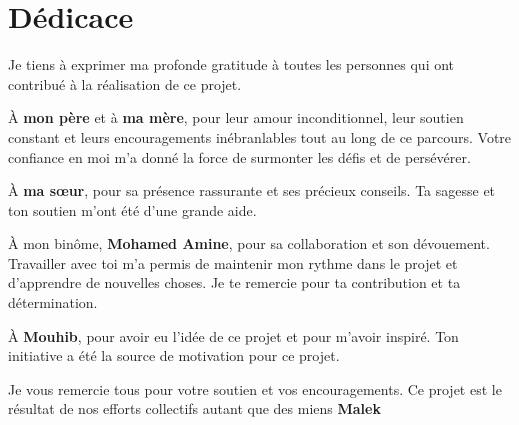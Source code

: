 \thispagestyle{empty}

\chapter*{Dédicace}

Je tiens à exprimer ma profonde gratitude à toutes les personnes qui ont contribué à la réalisation de ce projet.
\vspace{1em}

À \textbf{mon père} et à \textbf{ma mère}, pour leur amour inconditionnel, leur soutien constant et leurs encouragements inébranlables tout au long de ce parcours. Votre confiance en moi m'a donné la force de surmonter les défis et de persévérer.

À \textbf{ma sœur}, pour sa présence rassurante et ses précieux conseils. Ta sagesse et ton soutien m'ont été d'une grande aide.

À mon binôme, \textbf{Mohamed Amine}, pour sa collaboration et son dévouement. Travailler avec toi m'a permis de maintenir mon rythme dans le projet et d'apprendre de nouvelles choses. Je te remercie pour ta contribution et ta détermination.

À \textbf{Mouhib}, pour avoir eu l'idée de ce projet et pour m'avoir inspiré. Ton initiative a été la source de motivation pour ce projet.

Je vous remercie tous pour votre soutien et vos encouragements. Ce projet est le résultat de nos efforts collectifs autant que des miens
\vfill
\hfill \textbf{Malek}